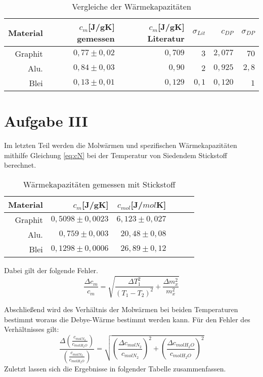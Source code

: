 \begin{table}[h!]
    \centering
    \begin{tabular}{r r r r r r}
        \toprule
        Material & $c_m$[J/gK] gemessen & $c_m$[J/gK] Literatur& $\sigma_{Lit}$ & $c_{DP}$ & $\sigma_{DP}$ \\
        \midrule
        Graphit &  $0,77 \pm 0,02 $ & $0,709$& $3$&$2,077$ &$70$\\
        Alu. & $0,84 \pm 0,03$ &$0,90$&$2$ &$0,925$ &$ 2,8 $\\
        Blei  & $0,13 \pm 0,01$ &$0,129$& $0,1$ &$0,120$&$1$\\
        \bottomrule
        
        
    \end{tabular}
    \caption{Vergleiche der Wärmekapazitäten}
\end{table}
\section{Aufgabe III}
Im letzten Teil werden die Molwärmen und spezifischen Wärmekapazitäten mithilfe Gleichung \ref{eq:cN} bei der
Temperatur von Siedendem Stickstoff berechnet.

\begin{table}[h!]
    \centering
    \begin{tabular}{r r r r r r}
        \toprule
        Material & $c_m$[J/gK] & $c_{mol}$[J/$mol$K] \\
        \midrule
        Graphit & $ 0,5098 \pm 0,0023 $ & $6,123 \pm 0,027$ \\
        Alu. & $0,759 \pm 0,003 $ & $20,48 \pm 0,08$ \\
        Blei & $0,1298 \pm 0,0006 $ &$ 26,89 \pm 0,12$ \\
        \bottomrule
        
    \end{tabular}
    \caption{Wärmekapazitäten gemessen mit Stickstoff}

\end{table}
Dabei gilt der folgende Fehler.
\begin{equation}
    \frac{\Delta c_m}{c_m}=\sqrt{\frac{\Delta T_{1}^{2}}{\left(T_{1} - T_{2}\right)^{2}} + \frac{\Delta m_{x}^{2}}{m_{x}^{2}}}
\end{equation}

Abschließend wird des Verhältnis der Molwärmen bei beiden Temperaturen bestimmt woraus die Debye-Wärme bestimmt werden kann.
Für den Fehler des Verhältnisses gilt:
\begin{equation}
    \frac{\Delta (\frac{c_{molN_2}}{c_{molH_2O}})}{(\frac{c_{molN_2}}{c_{molH_2O}})} = \sqrt{(\frac{\Delta c_{molN_2}}{c_{molN_2}})^2 + (\frac{\Delta c_{molH_2O}}{c_{molH_2O}})^2}
\end{equation}
Zuletzt lassen sich die Ergebnisse in folgender Tabelle zusammenfassen.

